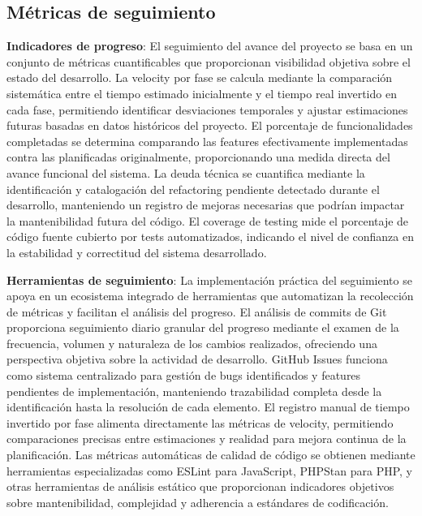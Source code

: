 \documentclass[12pt,a4paper,oneside]{report}
\begin{document}
\subsection{Métricas de seguimiento}\label{muxe9tricas-de-seguimiento}

\textbf{Indicadores de progreso}: El seguimiento del avance del proyecto se basa en un conjunto de métricas cuantificables que proporcionan visibilidad objetiva sobre el estado del desarrollo. La velocity por fase se calcula mediante la comparación sistemática entre el tiempo estimado inicialmente y el tiempo real invertido en cada fase, permitiendo identificar desviaciones temporales y ajustar estimaciones futuras basadas en datos históricos del proyecto. El porcentaje de funcionalidades completadas se determina comparando las features efectivamente implementadas contra las planificadas originalmente, proporcionando una medida directa del avance funcional del sistema. La deuda técnica se cuantifica mediante la identificación y catalogación del refactoring pendiente detectado durante el desarrollo, manteniendo un registro de mejoras necesarias que podrían impactar la mantenibilidad futura del código. El coverage de testing mide el porcentaje de código fuente cubierto por tests automatizados, indicando el nivel de confianza en la estabilidad y correctitud del sistema desarrollado.

\textbf{Herramientas de seguimiento}: La implementación práctica del seguimiento se apoya en un ecosistema integrado de herramientas que automatizan la recolección de métricas y facilitan el análisis del progreso. El análisis de commits de Git proporciona seguimiento diario granular del progreso mediante el examen de la frecuencia, volumen y naturaleza de los cambios realizados, ofreciendo una perspectiva objetiva sobre la actividad de desarrollo. GitHub Issues funciona como sistema centralizado para gestión de bugs identificados y features pendientes de implementación, manteniendo trazabilidad completa desde la identificación hasta la resolución de cada elemento. El registro manual de tiempo invertido por fase alimenta directamente las métricas de velocity, permitiendo comparaciones precisas entre estimaciones y realidad para mejora continua de la planificación. Las métricas automáticas de calidad de código se obtienen mediante herramientas especializadas como ESLint para JavaScript, PHPStan para PHP, y otras herramientas de análisis estático que proporcionan indicadores objetivos sobre mantenibilidad, complejidad y adherencia a estándares de codificación.
\end{document}
